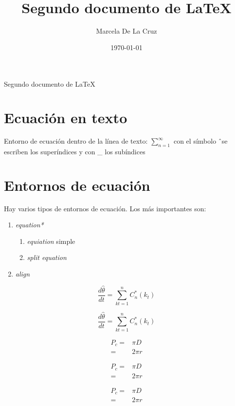 \documentclass{article}
\title {Segundo documento de \LaTeX}
\author {Marcela De La Cruz}
\date {\today}
\begin{document}
\maketitle
Segundo documento de LaTeX 


\section{Ecuaci\'on en texto}
Entorno de ecuaci\'on dentro de la l\'inea de texto: $\sum^{\infty}_{n=1}$
con el s\'imbolo \^\ se escriben los super\'indices y con \_ los sub\'indices

\section{Entornos de ecuaci\'on}

Hay varios tipos de entornos de ecuaci\'on. Los m\'as importantes son: 
\begin{enumerate}
\item \emph {equation*}
\begin{enumerate}
	\item \emph{equiation} simple
	\item \emph{split equation} 
\end{enumerate}
\item \emph {align}
\end{enumerate}


\begin{equation}
\frac{d \hat{\theta}}{dt} = \sum^{n}_{k{t}=1} C^{*}_{n}(k_{t})
\end{equation}

\begin{equation*}
\frac{d \hat{\theta}}{dt} = \sum^{n}_{k{t}=1} C^{*}_{n}(k_{t})
\end{equation*}

\begin{align}
P_{c}=& \pi D \nonumber \\
=& 2 \pi r
\end{align}

\begin{equation}
\begin{split}
P_{c}=& \pi D \\
=& 2 \pi r
\end{split}
\end{equation}

\begin{subequations}	
\begin{align}
P_{c}=& \pi D \\
=& 2 \pi r
\end{align}
\end{subequations}
\end{document}
